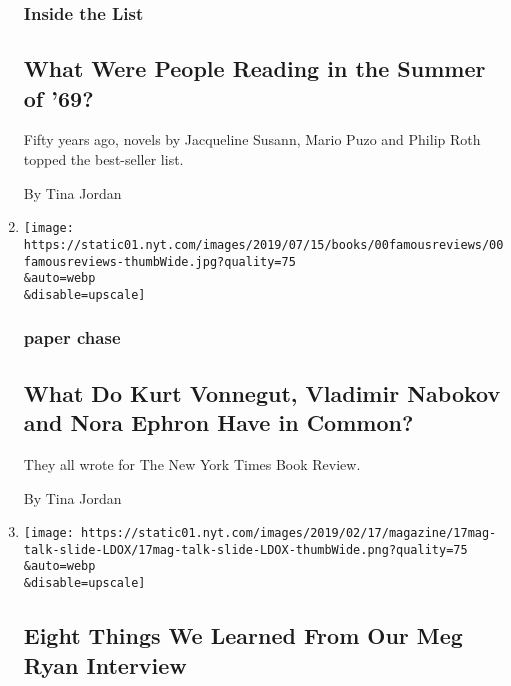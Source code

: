 \begin{enumerate}
  \hypertarget{inside-the-list}{%
  \subsubsection{Inside the List}\label{inside-the-list}}

  \hypertarget{what-were-people-reading-in-the-summer-of-69}{%
  \subsection{What Were People Reading in the Summer of
  '69?}\label{what-were-people-reading-in-the-summer-of-69}}

  Fifty years ago, novels by Jacqueline Susann, Mario Puzo and Philip
  Roth topped the best-seller list.

  By Tina Jordan
\item
  \href{/2019/07/29/books/review/ephron-vonnegut-nabokov-reviews.html}{}

  \texttt{[image: https://static01.nyt.com/images/2019/07/15/books/00famousreviews/00famousreviews-thumbWide.jpg?quality=75\\\&auto=webp\\\&disable=upscale]}

  \hypertarget{paper-chase}{%
  \subsubsection{paper chase}\label{paper-chase}}

  \hypertarget{what-do-kurt-vonnegut-vladimir-nabokov-and-nora-ephron-have-in-common}{%
  \subsection{What Do Kurt Vonnegut, Vladimir Nabokov and Nora Ephron
  Have in
  Common?}\label{what-do-kurt-vonnegut-vladimir-nabokov-and-nora-ephron-have-in-common}}

  They all wrote for The New York Times Book Review.

  By Tina Jordan
\item
  \href{/2019/02/15/magazine/eight-things-we-learned-from-our-meg-ryan-interview.html}{}

  \texttt{[image: https://static01.nyt.com/images/2019/02/17/magazine/17mag-talk-slide-LDOX/17mag-talk-slide-LDOX-thumbWide.png?quality=75\\\&auto=webp\\\&disable=upscale]}

  \hypertarget{eight-things-we-learned-from-our-meg-ryan-interview}{%
  \subsection{Eight Things We Learned From Our Meg Ryan
  Interview}\label{eight-things-we-learned-from-our-meg-ryan-interview}}


\end{enumerate}
